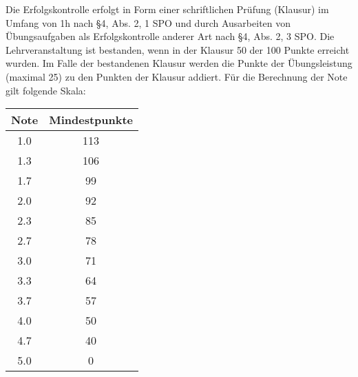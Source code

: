 \begin{course}

\setdoclanguagegerman
{}



\coursehead


\label{cour_4435.dp_997}


\begin{styleenv}
\begin{assessment}
Die Erfolgskontrolle erfolgt in Form einer schriftlichen Prüfung (Klausur) im Umfang von 1h nach §4, Abs. 2, 1 SPO und durch Ausarbeiten von Übungsaufgaben als Erfolgskontrolle anderer Art nach §4, Abs. 2, 3 SPO.\newline
\newline
 Die Lehrveranstaltung ist bestanden, wenn in der Klausur 50 der 100 Punkte erreicht wurden. Im Falle der bestandenen Klausur werden die Punkte der Übungsleistung (maximal 25) zu den Punkten der Klausur addiert. Für die Berechnung der Note gilt folgende Skala:

 

\begin{center}
\begin{tabular}{cc}
Note & Mindestpunkte \\
\hline
1.0 & 113 \\
1.3 & 106 \\
1.7 & 99 \\
2.0 & 92 \\
2.3 & 85 \\
2.7 & 78 \\
3.0 & 71 \\
3.3 & 64 \\
3.7 & 57 \\
4.0 & 50 \\
\hline
4.7 & 40 \\
5.0 & 0 \\
\end{tabular}
\end{center}


\end{assessment}
\end{styleenv}
\end{course}
